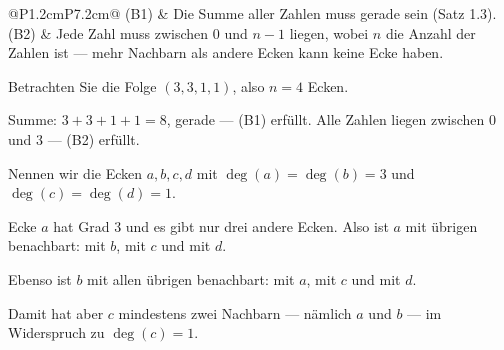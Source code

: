 \begin{merksatz}
\begin{center}
\renewcommand{\arraystretch}{1.5}
\begin{tabular}{@{}P{1.2cm}P{7.2cm}@{}}
\toprule
(B1) & Die Summe aller Zahlen muss gerade sein (Satz 1.3).\\
(B2) & Jede Zahl muss zwischen $0$ und $n-1$ liegen, wobei $n$ die Anzahl der Zahlen ist --- mehr Nachbarn als andere Ecken kann keine Ecke haben.\\
\bottomrule
\end{tabular}
\end{center}

\begin{center}
\begin{minipage}{0.88\textwidth}
\end{minipage}
\end{center}
\end{merksatz}

\begin{warnung}
Betrachten Sie die Folge $(3,3,1,1)$, also $n = 4$ Ecken.

Summe: $3+3+1+1 = 8$, gerade --- (B1) erfüllt. Alle Zahlen liegen zwischen $0$ und $3$ --- (B2) erfüllt.

Nennen wir die Ecken $a, b, c, d$ mit $\deg(a) = \deg(b) = 3$ und $\deg(c) = \deg(d) = 1$.

Ecke $a$ hat Grad $3$ und es gibt nur drei andere Ecken. Also ist $a$ mit  übrigen benachbart: mit $b$, mit $c$ und mit $d$.

Ebenso ist $b$ mit allen übrigen benachbart: mit $a$, mit $c$ und mit $d$.

Damit hat aber $c$ mindestens zwei Nachbarn --- nämlich $a$ und $b$ --- im Widerspruch zu $\deg(c) = 1$.

\begin{center}
\begin{minipage}{0.88\textwidth}
\end{minipage}
\end{center}
\end{warnung}

